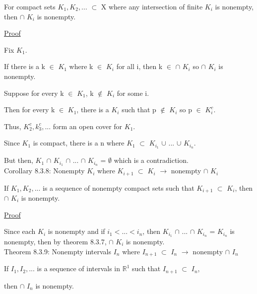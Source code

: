 	\begin{adjustbox}{minipage=14cm, right, vspace=0.1cm 0cm}
		For compact sets $K_1, K_2, ...$ $\subset$ X where any intersection
		of finite $K_i$ is nonempty, then $\cap$ $K_i$ is nonempty.
	\end{adjustbox}

{ \color{magenta} \underline{Proof} } 

	Fix $K_1$.

	If there is a k $\in$ $K_1$ where k $\in$ $K_i$ for all i, then
	k $\in$ $\cap$ $K_i$ so $\cap$ $K_i$ is nonempty.

	Suppose for every k $\in$ $K_1$, k $\not \in$ $K_i$ for some i.

	Then for every k $\in$ $K_1$, there is a $K_i$ such that
	p $\not \in$ $K_i$ so p $\in$ $K_i^c$.

	Thus, $K_2^c, k_3^c, ...$ form an open cover for $K_1$.

	Since $K_1$ is compact, there is a n where
	$K_1$ $\subset$ $K_{i_1}$ $\cup$ ... $\cup$ $K_{i_n}$.

	But then, $K_1$ $\cap$ $K_{i_1}$ $\cap$ ... $\cap$ $K_{i_n}$
	= $\emptyset$ which is a contradiction. \\

{ \color{orange} Corollary 8.3.8: Nonempty $K_i$ where $K_{i+1}$ $\subset$ $K_i$
$\rightarrow$ nonempty $\cap$ $K_i$}

	\begin{adjustbox}{minipage=14cm, right, vspace=0.1cm 0cm}
		If $K_1, K_2, ...$ is a sequence of nonempty compact sets
		such that $K_{i+1}$ $\subset$ $K_i$, then $\cap$ $K_i$ is nonempty.
	\end{adjustbox}

{ \color{magenta} \underline{Proof} } 

	Since each $K_i$ is nonempty and if $i_1 < ... < i_n$, then
	$K_{i_1}$ $\cap$ ... $\cap$ $K_{i_n}$
	= $K_{i_n}$ is nonempty, then
	by {\color{red} theorem 8.3.7}, $\cap$ $K_i$ is nonempty. \\

{ \color{red} Theorem 8.3.9: Nonempty intervals $I_n$ where
$I_{n+1}$ $\subset$ $I_n$ $\rightarrow$ nonempty $\cap$ $I_n$}

	\begin{adjustbox}{minipage=14cm, right, vspace=0.1cm 0cm}
		If $I_1, I_2, ...$ is a sequence of intervals in $\mathbb{R}^1$
		such that $I_{n+1}$ $\subset$ $I_n$,
		
		then $\cap$ $I_n$ is nonempty.
	\end{adjustbox}

